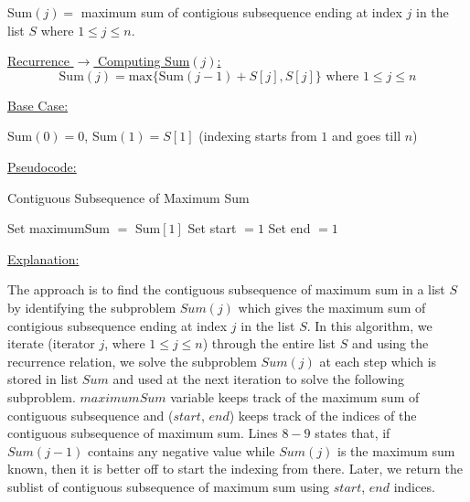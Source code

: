 \documentclass[letterpaper,11pt]{article}
\begin{document}
Sum$(j) =$ maximum sum of contigious subsequence ending at index $j$ in the list $S$ where $1 \leq j \leq n$.

\underline{Recurrence $\rightarrow$ Computing Sum$(j)$:} \[ \text{Sum}(j) = \text{max} \{\text{Sum}(j-1) + S[j], S[j]\} \text{ where } 1 \leq j \leq n \] 

\underline{Base Case:}

Sum$(0) = 0$, Sum$(1) = S[1]$ (indexing starts from $1$ and goes till $n$)

\underline{Pseudocode:}

\begin{algorithm}
    
    \caption{Contiguous Subsequence of Maximum Sum}
    

    
    Set maximumSum $=$ Sum$[1]$ 
    Set start $= 1$ 
    Set end $= 1$ 
    
\end{algorithm}

\underline{Explanation:}

The approach is to find the contiguous subsequence of maximum sum in a list $S$ by identifying the subproblem $Sum(j)$ which gives the maximum sum of contigious subsequence ending at index $j$ in the list $S$. In this algorithm, we iterate (iterator $j$, where $1 \leq j \leq n$) through the entire list $S$ and using the recurrence relation, we solve the subproblem $Sum(j)$ at each step which is stored in list $Sum$ and used at the next iteration to solve the following subproblem. $maximumSum$ variable keeps track of the maximum sum of contiguous subsequence and ($start$, $end$) keeps track of the indices of the contiguous subsequence of maximum sum. Lines $8-9$ states that, if $Sum(j-1)$ contains any negative value while $Sum(j)$ is the maximum sum known, then it is better off to start the indexing from there. Later, we return the sublist of contiguous subsequence of maximum sum using $start$, $end$ indices.
\end{document}
